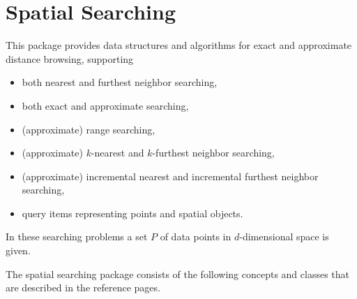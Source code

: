 \chapter{Spatial Searching}
\label{ChapterReferenceSpatialSearching}

This package provides data structures and algorithms for exact and approximate distance browsing,
supporting

\begin{itemize} 

\item
both nearest and furthest neighbor searching,

\item
both exact and approximate searching,

\item
(approximate) range searching,

\item 
(approximate) $k$-nearest and $k$-furthest neighbor searching,

\item 
(approximate) incremental nearest and incremental furthest neighbor searching,

\item
query items representing points and spatial objects.

\end{itemize}


In these searching problems a set $P$ of data points in $d$-dimensional
space is given.

The spatial searching package consists of the following concepts and
classes that are described in the reference pages.





 \\
 \\
 \\
 \\


